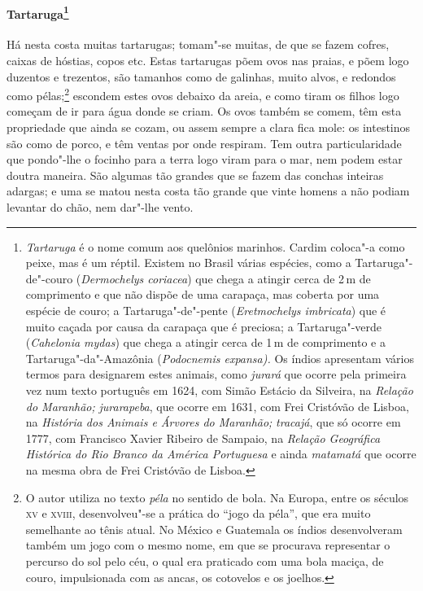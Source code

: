\paragraph{Tartaruga\footnote{ \textit{Tartaruga} é o nome comum aos
quelônios marinhos. Cardim coloca"-a como peixe, mas é um réptil.
Existem no Brasil várias espécies, como a Tartaruga"-de"-couro
(\textit{Dermochelys coriacea}) que chega a atingir cerca de 2\,m de
comprimento e que não dispõe de uma carapaça, mas coberta por uma
espécie de couro; a Tartaruga"-de"-pente (\textit{Eretmochelys
imbricata}) que é muito caçada por causa da carapaça que é preciosa; a
Tartaruga"-verde (\textit{Cahelonia mydas}) que chega a atingir cerca
de 1\,m de comprimento e a Tartaruga"-da"-Amazônia (\textit{Podocnemis
expansa).} Os índios apresentam vários termos para designarem estes
animais, como \textit{jurará} que ocorre pela primeira vez num texto
português em 1624, com Simão Estácio da Silveira, na \textit{Relação do
Maranhão;} \textit{jurarapeba}, que ocorre em 1631, com Frei Cristóvão
de Lisboa, na \textit{História dos Animais e Árvores do Maranhão;} 
\textit{tracajá}, que só ocorre em 1777, com Francisco Xavier Ribeiro
de Sampaio, na \textit{Relação Geográfica Histórica do Rio Branco da
América Portuguesa} e ainda \textit{matamatá} que ocorre na mesma obra
de Frei Cristóvão de Lisboa.}} Há nesta costa muitas
tartarugas; tomam"-se muitas, de que se fazem cofres, caixas de hóstias,
copos etc. Estas tartarugas põem ovos nas praias, e põem logo duzentos
e trezentos, são tamanhos como de galinhas, muito alvos, e redondos
como pélas;\footnote{ O autor utiliza no texto \textit{péla} no sentido
de bola. Na Europa, entre os séculos \textsc{xv} e \textsc{xviii}, desenvolveu"-se a
prática do ``jogo da péla'', que era muito semelhante ao tênis atual. No
México e Guatemala os índios desenvolveram também um jogo com o mesmo
nome, em que se procurava representar o percurso do sol pelo céu, o
qual era praticado com uma bola maciça, de couro, impulsionada com as
ancas, os cotovelos e os joelhos.} escondem estes ovos debaixo da
areia, e como tiram os filhos logo começam de ir para água donde se
criam. Os ovos também se comem, têm esta propriedade que ainda se
cozam, ou assem sempre a clara fica mole: os intestinos são como de
porco, e têm ventas por onde respiram. Tem outra particularidade que
pondo"-lhe o focinho para a terra logo viram para o mar, nem podem
estar doutra maneira. São algumas tão grandes que se fazem das conchas
inteiras adargas; e uma se matou nesta costa tão grande que vinte
homens a não podiam levantar do chão, nem dar"-lhe vento.

